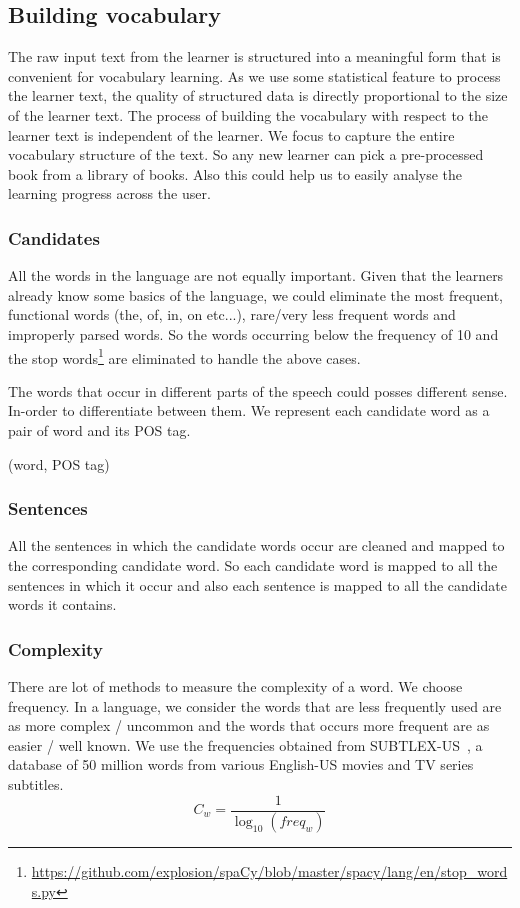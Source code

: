 \documentclass[11pt,a4paper]{article}
\begin{document}
\subsection{Building vocabulary}
The raw input text from the learner is structured into a meaningful form that is
convenient for vocabulary learning. As we use some statistical feature to
process the learner text, the quality of structured data is directly
proportional to the size of the learner text. The process of building the
vocabulary with respect to the learner text is independent of the learner. We focus
to capture the entire vocabulary structure of the text. So any new learner can
pick a pre-processed book from a library of books. Also this could help us to easily
analyse the learning progress across the user.

\subsubsection{Candidates}
All the words in the language are not equally important. Given that the learners
already know some basics of the language, we could eliminate the most frequent, 
functional words (the, of, in, on etc...), rare/very less frequent words and
improperly parsed words. So the words occurring below the frequency of 10 and
the stop words\footnote{\url{https://github.com/explosion/spaCy/blob/master/spacy/lang/en/stop_words.py}} are eliminated to handle the above cases. 

The words that occur in different parts of the speech could posses different sense.
In-order to differentiate between them. We represent each candidate word as a
pair of word and its POS tag.
\begin{center}(word, POS tag)\end{center}

\subsubsection{Sentences}
All the sentences in which the candidate words occur are cleaned and mapped to
the corresponding candidate word. So each candidate word is mapped to all the sentences
in which it occur and also each sentence is mapped to all the candidate
words it contains.

\subsubsection{Complexity}
There are lot of methods to measure the complexity of a word. We choose frequency.
In a language, we consider the words that are less frequently used are as
more complex / uncommon and the words that occurs more frequent are as easier / well known.
We use the frequencies obtained from SUBTLEX-US~\citet{brysbaert2009moving}, a database of 50 million
words from various English-US movies and TV series subtitles.
\begin{equation}
  C_w = \frac{1}{\log_{10}(freq_w)}
\end{equation}
\end{document}
